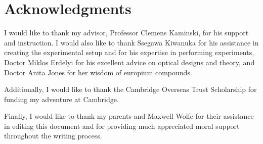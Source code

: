 



\bigskip

\begingroup
\let\clearpage\relax
\let\cleardoublepage\relax
\let\cleardoublepage\relax
\chapter*{Acknowledgments}

I would like to thank my advisor, Professor Clemens Kaminski, for his support
and instruction. I would also like to thank Ssegawa Kiwanuka for his assistance
in creating the experimental setup and for his expertise in performing
experiments, Doctor Miklos Erdelyi for his excellent advice on optical designs
and theory, and Doctor Anita Jones for her wisdom of europium compounds.

Additionally, I would like to thank the Cambridge Overseas Trust Scholarship
for funding my adventure at Cambridge.

Finally, I would like to thank my parents and Maxwell Wolfe for their
assistance in editing this document and for providing much appreciated moral
support throughout the writing process.


\endgroup



